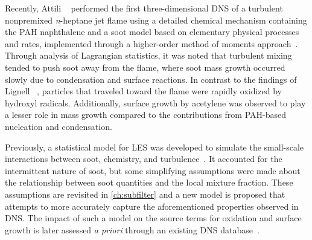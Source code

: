 Recently, Attili \etal~\cite{attili2014} performed the first three-dimensional DNS of a turbulent nonpremixed \textit{n}-heptane jet flame using a detailed chemical mechanism containing the PAH naphthalene and a soot model based on elementary physical processes and rates, implemented through a higher-order method of moments approach~\cite{hmom2009}. Through analysis of Lagrangian statistics, it was noted that turbulent mixing tended to push soot away from the flame, where soot mass growth occurred slowly due to condensation and surface reactions. In contrast to the findings of Lignell \etal~\cite{lignell2007,lignell2008}, particles that traveled toward the flame were rapidly oxidized by hydroxyl radicals. Additionally, surface growth by acetylene was observed to play a lesser role in mass growth compared to the contributions from PAH-based nucleation and condensation.

Previously, a statistical model for LES was developed to simulate the small-scale interactions between soot, chemistry, and turbulence~\cite{subfilterpdf2011}. It accounted for the intermittent nature of soot, but some simplifying assumptions were made about the relationship between soot quantities and the local mixture fraction. These assumptions are revisited in \cref{ch:subfilter} and a new model is proposed that attempts to more accurately capture the aforementioned properties observed in DNS. The impact of such a model on the source terms for oxidation and surface growth is later assessed \textit{a priori} through an existing DNS database~\cite{attili2014}.




